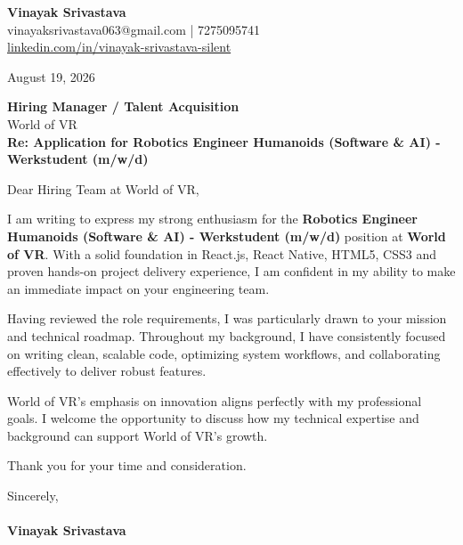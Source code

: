 \documentclass[11pt,a4paper]{article}
\begin{document}
\thispagestyle{empty}

{\Large \textbf{Vinayak Srivastava}}\\
vinayaksrivastava063@gmail.com | 7275095741 \\
\url{linkedin.com/in/vinayak-srivastava-silent}

\vspace{1em}
\hfill August 19, 2026

\textbf{Hiring Manager / Talent Acquisition}\\
World of VR\\

\vspace{1.5em}
\textbf{Re: Application for Robotics Engineer Humanoids (Software & AI) - Werkstudent (m/w/d)}

\vspace{1em}
Dear Hiring Team at World of VR,

I am writing to express my strong enthusiasm for the \textbf{Robotics Engineer Humanoids (Software & AI) - Werkstudent (m/w/d)} position at \textbf{World of VR}. With a solid foundation in React.js, React Native, HTML5, CSS3 and proven hands-on project delivery experience, I am confident in my ability to make an immediate impact on your engineering team.

Having reviewed the role requirements, I was particularly drawn to your mission and technical roadmap. Throughout my background, I have consistently focused on writing clean, scalable code, optimizing system workflows, and collaborating effectively to deliver robust features.

World of VR's emphasis on innovation aligns perfectly with my professional goals. I welcome the opportunity to discuss how my technical expertise and background can support World of VR's growth.

Thank you for your time and consideration.

\vspace{1.5em}
Sincerely,\\
\vspace{1em}\\
\textbf{Vinayak Srivastava}
\end{document}
